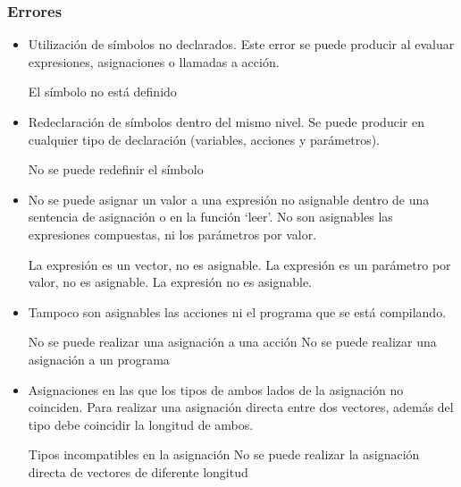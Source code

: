 \subsubsection{Errores}
\begin{itemize}
    \item Utilización de símbolos no declarados. Este error se puede producir al evaluar expresiones, asignaciones o llamadas a acción.

    \begin{codigo}
    El símbolo no está definido
    \end{codigo}

    \item Redeclaración de símbolos dentro del mismo nivel. Se puede producir en cualquier tipo de declaración (variables, acciones y parámetros).

    \begin{codigo}
    No se puede redefinir el símbolo
    \end{codigo}

    \item No se puede asignar un valor a una expresión no asignable dentro de una sentencia de asignación o en la función `leer'. No son asignables las expresiones compuestas, ni los parámetros por valor.

    \begin{codigo}
    La expresión es un vector, no es asignable.
    La expresión es un parámetro por valor, no es asignable.
    La expresión no es asignable.
    \end{codigo}

    \item Tampoco son asignables las acciones ni el programa que se está compilando.

    \begin{codigo}
    No se puede realizar una asignación a una acción
    No se puede realizar una asignación a un programa
    \end{codigo}


    \item Asignaciones en las que los tipos de ambos lados de la asignación no coinciden. Para realizar una asignación directa entre dos vectores, además del tipo debe coincidir la longitud de ambos.

    \begin{codigo}
    Tipos incompatibles en la asignación
    No se puede realizar la asignación directa de vectores de diferente longitud
    \end{codigo}


\end{itemize}
